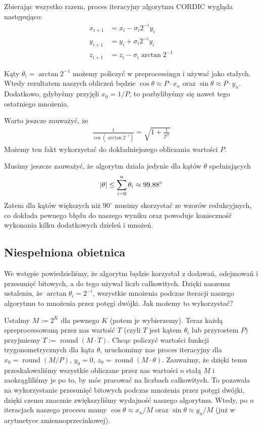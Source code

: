 \documentclass[12pt]{extarticle}
\DeclarePairedDelimiter\abs{\lvert}{\rvert}%
\DeclareMathOperator{\round}{{round}}
\theoremstyle{remark}
\theoremstyle{definition}
\theoremstyle{definition}
\begin{document}
Zbierając wszystko razem, proces iteracyjny algorytmu CORDIC wygląda następująco:
\begin{align*}
  x_{i + 1} & = x_{i} - \sigma_i 2^{-i}y_i    \\
  y_{i + 1} & = y_i + \sigma_i 2^{-i}y_i      \\
  z_{i + 1} & = z_i - \sigma_i \arctan 2^{-1}
\end{align*}

Kąty $\theta_i = \arctan{2^{-1}}$ możemy policzyć w preprocessingu i używać jako stałych. Wtedy rezultatem naszych obliczeń będzie $\cos\theta \approx P\cdot x_n$ oraz $\sin\theta \approx P\cdot y_n$. Dodatkowo, gdybyśmy przyjęli $x_0 = 1/P$, to pozbylibyśmy się nawet tego ostatniego mnożenia.

Warto jeszcze zauważyć, że
\begin{align*}
  \frac{1}{\cos(\arctan 2^{-i})} = \sqrt{1 + \frac{1}{2^{2i}}}
\end{align*}
Możemy ten fakt wykorzystać do dokładniejszego obliczania wartości $P$.

Musimy jeszcze zauważyć, że algorytm działa jedynie dla kątów $\theta$ spełniających
\begin{align*}
  \abs{\theta} \leq \sum_{i=0}^n\theta_i \approx 99.88^{\circ}
\end{align*}
Zatem dla kątów większych niż $90^{\circ}$ musimy skorzystać ze wzorów redukcyjnych, co dokłada pewnego błędu do naszego wyniku oraz powoduje konieczność wykonania kilku dodatkowych dzieleń i mnożeń.

\subsection{Niespełniona obietnica}
We wstępie powiedzieliśmy, że algorytm będzie korzystał z dodawań, odejmowań i przesunięć bitowych, a do tego używał liczb całkowitych. Dzięki naszemu ustaleniu, że $\arctan\theta_i = 2^{-i}$, wszystkie mnożenia podczas iteracji naszego algorytmu to mnożenia przez potęgi dwójki. Jak możemy to wykorzystać?

Ustalmy $M := 2^{K}$ dla pewnego $K$ (potem je wybierzemy). Teraz każdą spreprocessowaną 
przez nas wartość $T$ (czyli $T$ jest kątem $\theta_i$ lub przyrostem $P$) przyjmiemy 
$T := \round(M \cdot T)$. Chcąc policzyć wartości funkcji trygonometrycznych dla kąta $\theta$, 
uruchomimy nas proces iteracyjny dla $x_0 = \round(M/P)$, $y_0 = 0$, $z_0 = \round(M\cdot\theta)$. 
Zauważmy, że dzięki temu przeskalowaliśmy wszystkie obliczane przez nas wartości o stałą $M$
i zaokrągliliśmy je po to, by móc pracować na liczbach całkowitych. To pozawala na wykorzystanie 
przesunięć bitowych podczas mnożenia przez potęgi dwójki, dzięki czemu znacznie zwiększyliśmy 
wydajność naszego algorytmu. Wtedy, po $n$ iteracjach naszego procesu mamy $\cos\theta \approx x_n/M$
oraz $\sin\theta\approx y_n/M$ (już w arytmetyce zmiennoprzecinkowej).
\end{document}
